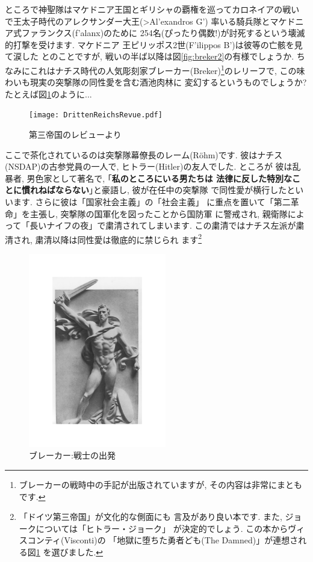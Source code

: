 ところで神聖隊はマケドニア王国とギリシャの覇権を巡ってカロネイアの戦い
で王太子時代のアレクサンダー大王(\textgreek{>Al'exandros G'})
率いる騎兵隊とマケドニア式ファランクス(\textgreek{f'alanx})のために
254名(ぴったり偶数!)が討死するという壊滅的打撃を受けます. マケドニア
王ピリッポス2世(\textgreek{F'ilippos B'})は彼等の亡骸を見て涙した
とのことですが, 戦いの半ば以降は図\ref{fig:breker2}の有様でしょうか.
 ちなみにこれはナチス時代の人気彫刻家ブレーカー(Breker)\footnote{
ブレーカーの戦時中の手記が出版されていますが, その内容は非常にまとも
です.}のレリーフで, この味わいも現実の突撃隊の同性愛を含む酒池肉林に
変幻するというものでしょうか? たとえば図\ref{fig:rrevue}のように...

\begin{figure}[htbp]
\begin{center}
\texttt{[image: DrittenReichsRevue.pdf]}
\caption{第三帝国のレビューより\cite{関}}
\label{fig:rrevue}
\end{center}
\end{figure}

ここで茶化されているのは突撃隊幕僚長のレーム(R\"ohm)です. 彼はナチス
(NSDAP)の古参党員の一人で, ヒトラー(Hitler)の友人でした. ところが
彼は乱暴者, 男色家として著名で, ｢\textbf{私のところにいる男たちは
法律に反した特別なことに慣れねばならない}｣と豪語し, 彼が在任中の突撃隊
で同性愛が横行したといいます. さらに彼は「国家社会主義」の「社会主義」
に重点を置いて「第二革命」を主張し, 突撃隊の国軍化を図ったことから国防軍
に警戒され, 親衛隊によって「長いナイフの夜」で粛清されてしまいます.
 この粛清ではナチス左派が粛清され, 粛清以降は同性愛は徹底的に禁じられ
ます\footnote{「ドイツ第三帝国」\cite{クラーザー}が文化的な側面にも
言及があり良い本です. また, ジョークについては「ヒトラー・ジョーク」
\cite{関}が決定的でしょう. この本からヴィスコンティ(Visconti)の
「地獄に堕ちた勇者ども(The Damned)」が連想される図\ref{fig:rrevue}
を選びました.}
\newpage

\begin{figure}
\includegraphics[width=6cm]{Breker2_relief.pdf}
\caption{ブレーカー:戦士の出発}
\label{fig:breker1}
\end{figure}


